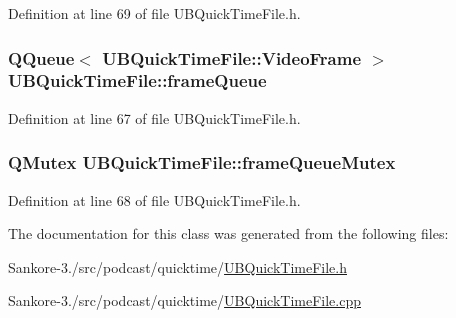 Definition at line 69 of file U\-B\-Quick\-Time\-File.\-h.

\hypertarget{class_u_b_quick_time_file_a284f54a169c1a7b24b7d0ff7fc907f2d}{
\subsubsection[{frame\-Queue}]{\setlength{\rightskip}{0pt plus 5cm}Q\-Queue$<$ {\bf U\-B\-Quick\-Time\-File\-::\-Video\-Frame} $>$ U\-B\-Quick\-Time\-File\-::frame\-Queue\hspace{0.3cm}{\ttfamily [static]}}}\label{dc/d83/class_u_b_quick_time_file_a284f54a169c1a7b24b7d0ff7fc907f2d}


Definition at line 67 of file U\-B\-Quick\-Time\-File.\-h.

\hypertarget{class_u_b_quick_time_file_a8179154729e1bfcda66f9c0cd52ec2cb}{
\subsubsection[{frame\-Queue\-Mutex}]{\setlength{\rightskip}{0pt plus 5cm}Q\-Mutex U\-B\-Quick\-Time\-File\-::frame\-Queue\-Mutex\hspace{0.3cm}{\ttfamily [static]}}}\label{dc/d83/class_u_b_quick_time_file_a8179154729e1bfcda66f9c0cd52ec2cb}


Definition at line 68 of file U\-B\-Quick\-Time\-File.\-h.



The documentation for this class was generated from the following files\-:\begin{DoxyCompactItemize}
\item 
Sankore-\/3./src/podcast/quicktime/\hyperlink{_u_b_quick_time_file_8h}{U\-B\-Quick\-Time\-File.\-h}\item 
Sankore-\/3./src/podcast/quicktime/\hyperlink{_u_b_quick_time_file_8cpp}{U\-B\-Quick\-Time\-File.\-cpp}\end{DoxyCompactItemize}
